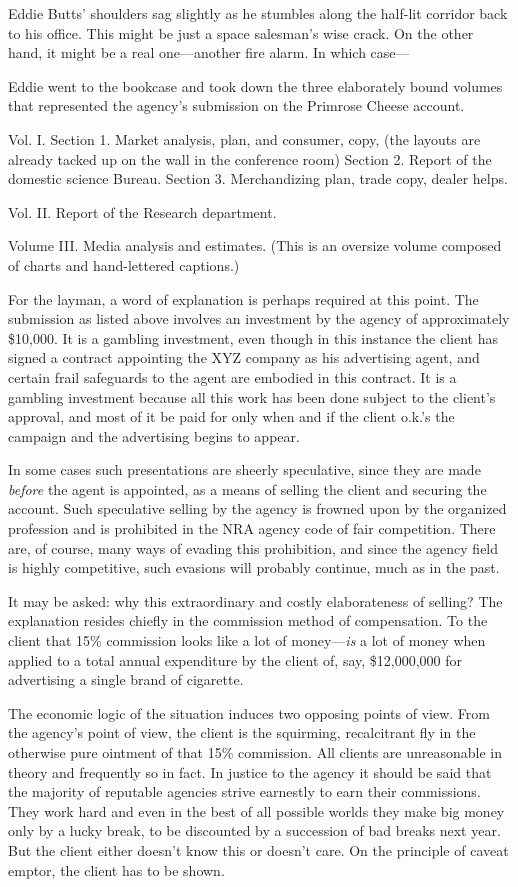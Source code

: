 \documentclass[nohyper,openany,nobib]{tufte-book}
\begin{document}
Eddie Butts' shoulders sag slightly as he stumbles along the half-lit
corridor back to his office. This might be just a space salesman's wise
crack. On the other hand, it might be a real one---another fire alarm.
In which case---

Eddie went to the bookcase and took down the three elaborately bound
volumes that represented the agency's submission on the Primrose Cheese
account.

Vol. I. Section 1. Market analysis, plan, and consumer, copy, (the
layouts are already tacked up on the wall in the conference room)
Section 2. Report of the domestic science Bureau. Section 3.
Merchandizing plan, trade copy, dealer helps.

Vol. II. Report of the Research department.

Volume III. Media analysis and estimates. (This is an oversize volume
composed of charts and hand-lettered captions.)

For the layman, a word of explanation is perhaps required at this point.
The submission as listed above involves an investment by the agency of
approximately \$10,000. It is a gambling investment, even though in this
instance the client has signed a contract appointing the XYZ company as
his advertising agent, and certain frail safeguards to the agent are
embodied in this contract. It is a gambling investment because all this
work has been done subject to the client's approval, and most of it be
paid for only when and if the client o.k.'s the campaign and the
advertising begins to appear.

In some cases such presentations are sheerly speculative, since they are
made \emph{before} the agent is appointed, as a means of selling the
client and securing the account. Such speculative selling by the agency
is frowned upon by the organized profession and is prohibited in the NRA
agency code of fair competition. There are, of course, many ways of
evading this prohibition, and since the agency field is highly
competitive, such evasions will probably continue, much as in the past.

It may be asked: why this extraordinary and costly elaborateness of
selling? The explanation resides chiefly in the commission method of
compensation. To the client that 15\% commission looks like a lot of
money---\emph{is} a lot of money when applied to a total annual
expenditure by the client of, say, \$12,000,000 for advertising a single
brand of cigarette.

The economic logic of the situation induces two opposing points of view.
From the agency's point of view, the client is the squirming,
recalcitrant fly in the otherwise pure ointment of that 15\% commission.
All clients are unreasonable in theory and frequently so in fact. In
justice to the agency it should be said that the majority of reputable
agencies strive earnestly to earn their commissions. They work hard and
even in the best of all possible worlds they make big money only by a
lucky break, to be discounted by a succession of bad breaks next year.
But the client either doesn't know this or doesn't care. On the
principle of caveat emptor, the client has to be shown.
\end{document}
